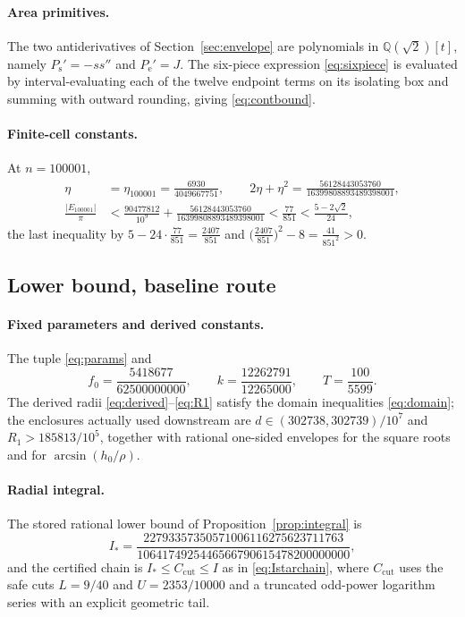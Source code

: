 \documentclass[11pt]{article}
\theoremstyle{plain}
\theoremstyle{definition}
\theoremstyle{remark}
\newcommand{\Q}{\mathbb{Q}}
\newcommand{\Ps}{P_{\mathrm{s}}}
\newcommand{\Pe}{P_{\mathrm{e}}}
\newcommand{\Istar}{I_{*}}
\begin{document}
\paragraph{Area primitives.} The two antiderivatives of
Section~\ref{sec:envelope} are polynomials in $\Q(\sqrt2)[t]$, namely
$\Ps'=-ss''$ and $\Pe'=J$. The six-piece expression \eqref{eq:sixpiece} is
evaluated by interval-evaluating each of the twelve endpoint terms on its
isolating box and summing with outward rounding, giving
\eqref{eq:contbound}.

\paragraph{Finite-cell constants.} At $n=100001$,
\begin{align*}
  \eta&=\eta_{100001}=\frac{6930}{4049667751},
  \qquad
  2\eta+\eta^{2}=\frac{56128443053760}{16399808893489398001},\\[4pt]
  \frac{|E_{100001}|}{\pi}
  &<\frac{90477812}{10^{9}}+\frac{56128443053760}{16399808893489398001}
  <\frac{77}{851}<\frac{5-2\sqrt2}{24},
\end{align*}
the last inequality by $5-24\cdot\frac{77}{851}=\frac{2407}{851}$ and
$\bigl(\frac{2407}{851}\bigr)^{2}-8=\frac{41}{851^{2}}>0$.

\subsection{Lower bound, baseline route}

\paragraph{Fixed parameters and derived constants.} The tuple \eqref{eq:params}
and
\[
  f_{0}=\frac{5418677}{62500000000},
  \qquad
  k=\frac{12262791}{12265000},
  \qquad
  T=\frac{100}{5599}.
\]
The derived radii \eqref{eq:derived}--\eqref{eq:R1} satisfy the domain
inequalities \eqref{eq:domain}; the enclosures actually used downstream are
$d\in(302738,302739)/10^{7}$ and $R_{1}>185813/10^{5}$, together with rational
one-sided envelopes for the square roots and for $\arcsin(h_{0}/\rho)$.

\paragraph{Radial integral.} The stored rational lower bound of
Proposition~\ref{prop:integral} is
\[
  \Istar=\frac{22793357350571006116275623711763}
              {1064174925446566790615478200000000},
\]
and the certified chain is $\Istar\le C_{\mathrm{cut}}\le I$ as in
\eqref{eq:Istarchain}, where $C_{\mathrm{cut}}$ uses the safe cuts
$L=9/40$ and $U=2353/10000$ and a truncated odd-power logarithm series with an
explicit geometric tail.
\end{document}
